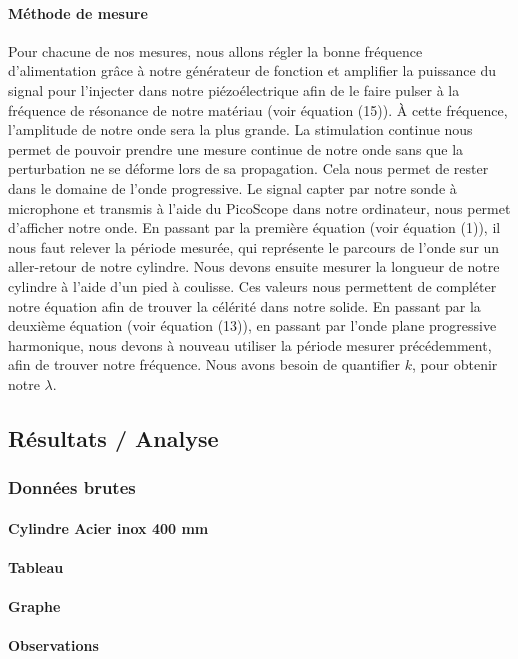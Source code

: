 \paragraph{Méthode de mesure}
Pour chacune de nos mesures, nous allons régler la bonne fréquence 
d'alimentation grâce à notre générateur de fonction et amplifier la puissance du signal
pour l'injecter dans notre piézoélectrique afin de le faire pulser à la 
fréquence de résonance de notre matériau (voir équation (15)).
À cette fréquence, l'amplitude de notre onde sera la plus grande.
La stimulation continue nous permet de pouvoir prendre une mesure continue
de notre onde sans que la perturbation ne se déforme lors de sa propagation.
Cela nous permet de rester dans le domaine de l'onde progressive.
Le signal capter par notre sonde à microphone et transmis 
à l'aide du PicoScope dans notre ordinateur, nous permet d'afficher notre 
onde. 
En passant par la première équation (voir équation (1)), il nous faut relever la période 
mesurée, qui représente le parcours de l'onde sur un aller-retour de 
notre cylindre. Nous devons ensuite mesurer la longueur de notre 
cylindre à l'aide d'un pied à coulisse. Ces valeurs nous permettent 
de compléter notre équation afin de trouver la célérité dans notre solide.
En passant par la deuxième équation (voir équation (13)), en passant par l'onde plane 
progressive harmonique, nous devons à nouveau utiliser la période 
mesurer précédemment, afin de trouver notre fréquence.
Nous avons besoin de quantifier $k$, pour obtenir notre $\lambda$.

\subsection{\large Résultats / Analyse}
\subsubsection{\large Données brutes}

\paragraph{\large Cylindre Acier inox 400 mm}
\paragraph{Tableau}
\paragraph{Graphe}
\paragraph{Observations}

